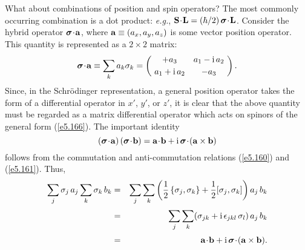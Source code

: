 What about combinations of position and spin operators? The most
commonly occurring combination  is a dot product: {\em e.g.}, 
${\bf S}\!\cdot\! {\bf L} = (\hbar/2)\,\mbox{\boldmath$\sigma$}\! \cdot\! {\bf L}$. 
Consider the hybrid
operator  $\mbox{\boldmath$\sigma$} \!\cdot \!{\bf a}$, where ${\bf a} \equiv (a_x, a_y, a_z)$ is
some  vector position  operator. This quantity is represented as 
a $2\times 2$ matrix:
\begin{equation}\label{e5.173}
\mbox{\boldmath$\sigma$}\! \cdot\! {\bf a} \equiv \sum_k a_k \sigma_k = 
\left(\!\begin{array}{cc} +a_3 & a_1 -{\rm i}\,a_2\\[0.5ex]
a_1 + {\rm i}\,a_2 & -a_3 \end{array}\!\right).
\end{equation}
Since, in the Schr\"{o}dinger representation, a general position operator takes
the form of a differential operator in $x'$, $y'$, or $z'$, it is clear that
the above quantity must be regarded as a matrix differential operator which
acts on spinors of the general form (\ref{e5.166}).
The important identity
\begin{equation}\label{e5.174}
(\bsigma \!\cdot \!{\bf a} ) \,(\bsigma \!\cdot\! {\bf b}) = {\bf a}\! \cdot\! {\bf b}
+{\rm i}\,\bsigma\!\cdot \!({\bf a} \times {\bf b} )
\end{equation}
follows from the commutation and anti-commutation relations (\ref{e5.160}) and (\ref{e5.161}). Thus,
\begin{eqnarray}
\sum_j \sigma_j \,a_j \sum_k \sigma_k \,b_k &=& \sum_j \sum_k \left(\frac{1}{2}\,
\{\sigma_j, \sigma_k\} + \frac{1}{2} [\sigma_j, \sigma_k]\right) a_j \,b_k\nonumber\\[0.5ex]
&=& \sum_j \sum_k (\sigma_{jk} + {\rm i}\,\epsilon_{jkl} \,\sigma_l)\,a_j \,b_k\nonumber\\[0.5ex]
&=& {\bf a} \!\cdot\! {\bf b}
+{\rm i}\,\mbox{\boldmath$\sigma$}\!\cdot\! ({\bf a} \times {\bf b} ).
\end{eqnarray}

